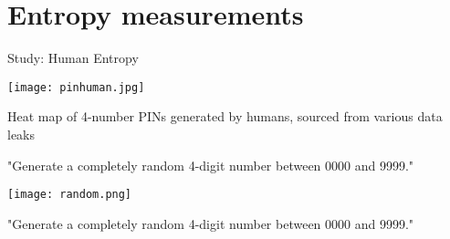 \documentclass[aspectratio=169]{beamer}
\begin{document}
\section{Entropy measurements}

\begin{frame}{Study: Human Entropy}
\begin{center}
\texttt{[image: pinhuman.jpg]}

\vspace{0.5cm}
\small{Heat map of 4-number PINs generated by humans, sourced from various data leaks}
\end{center}
\end{frame}

\begin{frame}{\small "Generate a completely random 4-digit number between 0000 and 9999."}
\begin{center}
\end{center}
\end{frame}

\begin{frame}
\begin{center}
\texttt{[image: random.png]}
\end{center}
\end{frame}

\begin{frame}{\small "Generate a completely random 4-digit number between 0000 and 9999."}
\begin{center}
\end{center}
\end{frame}
\end{document}
